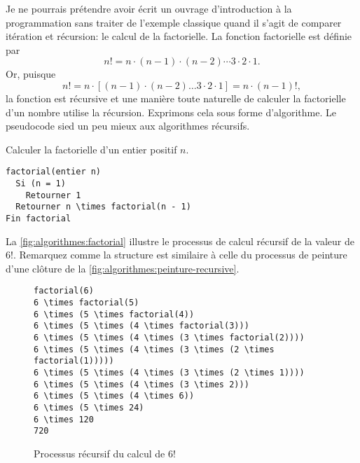 Je ne pourrais prétendre avoir écrit un ouvrage d'introduction à la
programmation sans traiter de l'exemple classique quand il s'agit de
comparer itération et
récursion: le calcul de la
factorielle. La fonction factorielle est définie
par
\begin{equation*}
  n! = n \cdot (n - 1) \cdot (n - 2) \cdots 3 \cdot 2 \cdot 1.
\end{equation*}
Or, puisque
\begin{equation*}
  n! = n \cdot [(n - 1) \cdot (n - 2) \dots 3 \cdot 2 \cdot 1] =
  n \cdot (n - 1)!,
\end{equation*}
la fonction est récursive et une manière toute naturelle de calculer
la factorielle d'un nombre utilise la récursion. Exprimons cela  sous
forme d'algorithme. Le pseudocode sied un peu mieux aux algorithmes
récursifs.

\begin{algorithme}
  \label{algo:algorithmes:factorielle-recursive}
  Calculer la factorielle d'un entier positif $n$.
  \begin{Schunk}
\begin{Verbatim}[commandchars=\\\{\}]
factorial(entier n)
  Si (n = 1)
    Retourner 1
  Retourner n \times factorial(n - 1)
Fin factorial
\end{Verbatim}
  \end{Schunk}
\end{algorithme}

La \autoref{fig:algorithmes:factorial} illustre le processus de calcul
récursif de la valeur de $6!$. Remarquez comme la structure est
similaire à celle du processus de peinture d'une clôture de la
\autoref{fig:algorithmes:peinture-recursive}.

\begin{figure}
  \centering
  \begin{minipage}{0.67\linewidth}
\begin{Verbatim}[commandchars=\\\{\}]
factorial(6)
6 \times factorial(5)
6 \times (5 \times factorial(4))
6 \times (5 \times (4 \times factorial(3)))
6 \times (5 \times (4 \times (3 \times factorial(2))))
6 \times (5 \times (4 \times (3 \times (2 \times factorial(1)))))
6 \times (5 \times (4 \times (3 \times (2 \times 1))))
6 \times (5 \times (4 \times (3 \times 2)))
6 \times (5 \times (4 \times 6))
6 \times (5 \times 24)
6 \times 120
720
\end{Verbatim}
  \end{minipage}
  \caption{Processus récursif du calcul de $6!$}
  \label{fig:algorithmes:factorial}
\end{figure}

